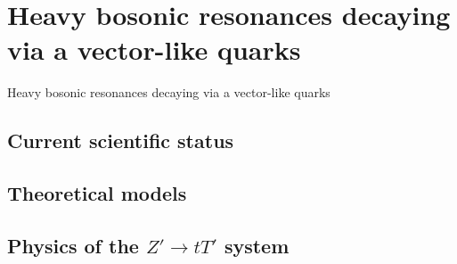 \chapter{Heavy bosonic resonances decaying via a vector-like quarks}



Heavy bosonic resonances decaying via a vector-like quarks


\section{Current scientific status}
\section{Theoretical models}

\section{Physics of the $Z'\rightarrow tT'$ system}
